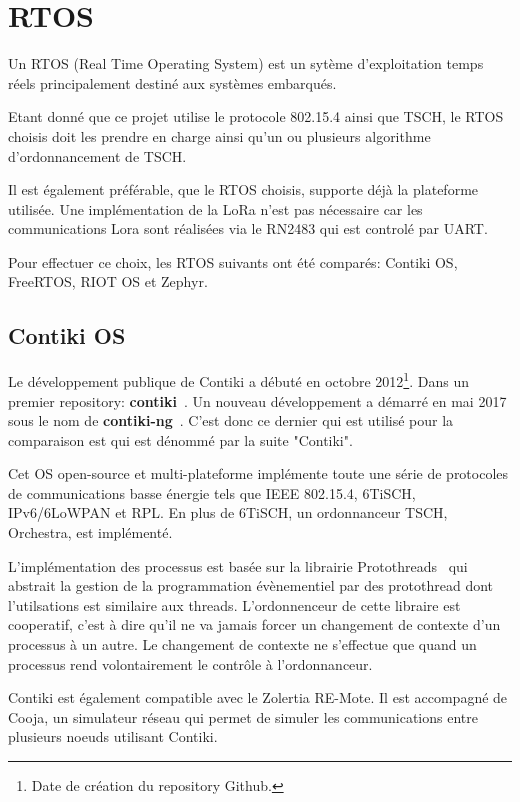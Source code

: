 \section{RTOS}

Un RTOS (Real Time Operating System) est un sytème d'exploitation temps réels principalement destiné aux systèmes embarqués.

Etant donné que ce projet utilise le protocole 802.15.4 ainsi que TSCH, le RTOS choisis doit les prendre en charge ainsi qu'un ou plusieurs algorithme d'ordonnancement de TSCH.

Il est également préférable, que le RTOS choisis, supporte déjà la plateforme utilisée. Une implémentation de la LoRa n'est pas nécessaire car les communications Lora sont réalisées via le RN2483 qui est controlé par UART.

Pour effectuer ce choix, les RTOS suivants ont été comparés: Contiki OS, FreeRTOS, RIOT OS et Zephyr.

\subsection*{Contiki OS}
    Le développement publique de Contiki a débuté en octobre 2012\footnote{Date de création du repository Github.}. Dans un premier repository: \textbf{contiki}~\cite{contiki-repo:old}. Un nouveau développement a démarré en mai 2017 sous le nom de \textbf{contiki-ng}~\cite{contiki-repo:ng}. C'est donc ce dernier qui est utilisé pour la comparaison est qui est dénommé par la suite "Contiki".

    Cet OS open-source et multi-plateforme implémente toute une série de protocoles de communications basse énergie tels que IEEE 802.15.4, 6TiSCH, IPv6/6LoWPAN et RPL. En plus de 6TiSCH, un ordonnanceur TSCH, Orchestra, est implémenté.

    L'implémentation des processus est basée sur la librairie Protothreads~\cite{paper:protothreads}
    qui abstrait la gestion de la programmation évènementiel par des protothread dont l'utilsations est similaire aux threads. L'ordonnenceur de cette libraire est cooperatif, c'est à dire qu'il ne va jamais forcer un changement de contexte d'un processus à un autre. Le changement de contexte ne s'effectue que quand un processus rend volontairement le contrôle à l'ordonnanceur.
    
    Contiki est également compatible avec le Zolertia RE-Mote. Il est accompagné de Cooja, un simulateur réseau qui permet de simuler les communications entre plusieurs noeuds utilisant Contiki.

